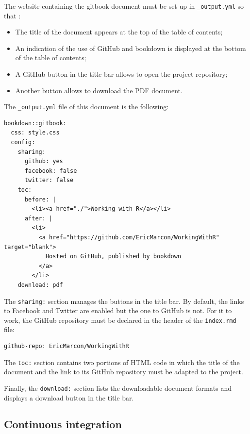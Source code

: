 \documentclass[
  12pt,
  american,
  a4paper,
  extrafontsizes,onecolumn,openright
  ]{memoir}
\providecommand{\tightlist}{%
  \setlength{\itemsep}{0pt}\setlength{\parskip}{0pt}}
\begin{document}
The website containing the gitbook document must be set up in \texttt{\_output.yml} so that :

\begin{itemize}
\tightlist
\item
  The title of the document appears at the top of the table of contents;
\item
  An indication of the use of GitHub and bookdown is displayed at the bottom of the table of contents;
\item
  A GitHub button in the title bar allows to open the project repository;
\item
  Another button allows to download the PDF document.
\end{itemize}

The \texttt{\_output.yml} file of this document is the following:

\begin{verbatim}
bookdown::gitbook:
  css: style.css
  config:
    sharing:
      github: yes
      facebook: false
      twitter: false
    toc:
      before: |
        <li><a href="./">Working with R</a></li>
      after: |
        <li>
          <a href="https://github.com/EricMarcon/WorkingWithR" target="blank">
            Hosted on GitHub, published by bookdown
          </a>
        </li>
    download: pdf
\end{verbatim}

The \texttt{sharing:} section manages the buttons in the title bar.
By default, the links to Facebook and Twitter are enabled but the one to GitHub is not.
For it to work, the GitHub repository must be declared in the header of the \texttt{index.rmd} file:

\begin{verbatim}
github-repo: EricMarcon/WorkingWithR
\end{verbatim}

The \texttt{toc:} section contains two portions of HTML code in which the title of the document and the link to its GitHub repository must be adapted to the project.

Finally, the \texttt{download:} section lists the downloadable document formats and displays a download button in the title bar.

\hypertarget{sec:rediger-ouvrage-ci}{%
\subsection{Continuous integration}\label{sec:rediger-ouvrage-ci}}
\end{document}
